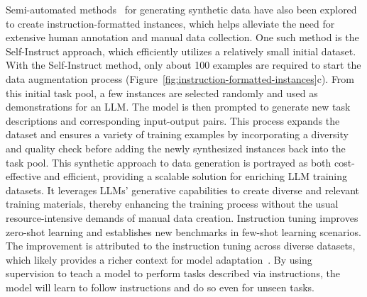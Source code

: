 Semi-automated methods~\cite{wang2022selfinstruct} for generating synthetic data have also been explored to create instruction-formatted instances, which helps alleviate the need for extensive human annotation and manual data collection.
One such method is the Self-Instruct approach, which efficiently utilizes a relatively small initial dataset.
With the Self-Instruct method, only about 100 examples are required to start the data augmentation process (Figure~\ref{fig:instruction-formatted-instances}c).
From this initial task pool, a few instances are selected randomly and used as demonstrations for an LLM. The model is then prompted to generate new task descriptions and corresponding input-output pairs.
This process expands the dataset and ensures a variety of training examples by incorporating a diversity and quality check before adding the newly synthesized instances back into the task pool.
This synthetic approach to data generation is portrayed as both cost-effective and efficient, providing a scalable solution for enriching LLM training datasets.
It leverages LLMs' generative capabilities to create diverse and relevant training materials, thereby enhancing the training process without the usual resource-intensive demands of manual data creation.
Instruction tuning improves zero-shot learning and establishes new benchmarks in few-shot learning scenarios.
The improvement is attributed to the instruction tuning across diverse datasets, which likely provides a richer context for model adaptation~\cite{wei2022fine}.
By using supervision to teach a model to perform tasks described via instructions, the model will learn to follow instructions and do so even for unseen tasks.

